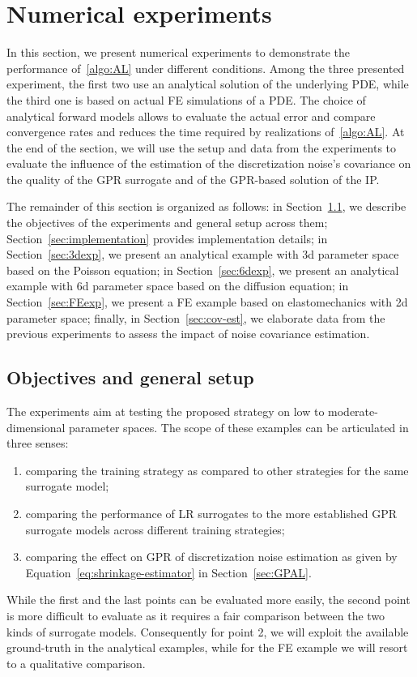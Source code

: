 \section{Numerical experiments}\label{sec:exp}

In this section, we present numerical experiments to demonstrate the performance of~\ref{algo:AL} under different conditions. 
Among the three presented experiment, the first two use an analytical solution of the underlying PDE, while the third one is based on actual FE simulations of a PDE.
The choice of analytical forward models allows to evaluate the actual error and compare convergence rates and reduces the time required by realizations of~\ref{algo:AL}. 
At the end of the section, we will use the setup and data from the experiments to evaluate the influence of the estimation of the discretization noise's covariance on the quality of the GPR surrogate and of the GPR-based solution of the IP.  \medskip 

The remainder of this section is organized as follows: in Section~\ref{sec:setup}, we describe the objectives of the experiments and general setup across them; Section~\ref{sec:implementation} provides implementation details; in Section~\ref{sec:3dexp}, we present an analytical example with 3d parameter space based on the Poisson equation; in Section~\ref{sec:6dexp}, we present an analytical example with 6d parameter space based on the diffusion equation; in Section~\ref{sec:FEexp}, we present a FE example based on elastomechanics with 2d parameter space; finally, in Section~\ref{sec:cov-est}, we elaborate data from the previous experiments to assess the impact of noise covariance estimation.

\subsection{Objectives and general setup}\label{sec:setup}

The experiments aim at testing the proposed strategy on low to moderate-dimensional parameter spaces.
The scope of these examples can be articulated in three senses:
\begin{enumerate}
    \item comparing the training strategy as compared to other strategies for the same surrogate model;
    \item comparing the performance of LR surrogates to the more established GPR surrogate models across different training strategies;
    \item comparing the effect on GPR of discretization noise estimation as given by Equation~\eqref{eq:shrinkage-estimator} in Section~\ref{sec:GPAL}.
\end{enumerate}
While the first and the last points can be evaluated more easily, the second point is more difficult to evaluate as it requires a fair comparison between the two kinds of surrogate models.
Consequently for point 2, we will exploit the available ground-truth in the analytical examples, while for the FE example we will resort to a qualitative comparison.

